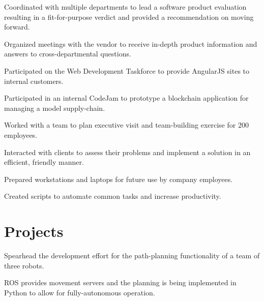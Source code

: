 \documentclass[]{deedy-resume-reversed}
\begin{document}
\begin{minipage}[t]{0.60\textwidth}
\begin{tightemize}
\item Coordinated with multiple departments to lead a software product evaluation resulting in a fit-for-purpose verdict and provided a recommendation on moving forward.
\item Organized meetings with the vendor to receive in-depth product information and answers to cross-departmental questions.
\item Participated on the Web Development Taskforce to provide AngularJS sites to internal customers.
\item Participated in an internal CodeJam to prototype a blockchain application for managing a model supply-chain.
\item Worked with a team to plan executive visit and team-building exercise for 200 employees.
\end{tightemize}
\sectionsep

\begin{tightemize}
\item Interacted with clients to assess their problems and implement a solution in an efficient, friendly manner.
\item Prepared workstations and laptops for future use by company employees.
\item Created scripts to automate common tasks and increase productivity.
\end{tightemize}
\sectionsep


\section{Projects}
\begin{tightemize}
\item Spearhead the development effort for the path-planning functionality of a team of three robots.
\item ROS provides movement servers and the planning is being implemented in Python to allow for fully-autonomous operation.
\end{tightemize}
\sectionsep


\end{minipage}
\end{document}
